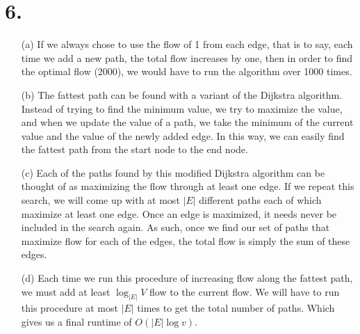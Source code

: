 \documentclass[11pt]{article}
\begin{document}
\section*{6.}
\begin{enumerate}
\item[(a)] If we always chose to use the flow of 1 from each edge, that is to
say, each time we add a new path, the total flow increases by one, then in order
to find the optimal flow (2000), we would have to run the algorithm over 1000
times. 
\item[(b)] The fattest path can be found with a variant of the Dijkstra
algorithm. Instead of trying to find the minimum value, we try to maximize the
value, and when we update the value of a path, we take the minimum of the
current value and the value of the newly added edge. In this way, we can easily
find the fattest path from the start node to the end node. 
\item[(c)] Each of the paths found by this modified Dijkstra algorithm can be
thought of as maximizing the flow through at least one edge. If we repeat this
search, we will come up with at most $|E|$ different paths each of which
maximize at least one edge. Once an edge is maximized, it needs never be
included in the search again. As such, once we find our set of paths that
maximize flow for each of the edges, the total flow is simply the sum of these
edges. 
\item[(d)] Each time we run this procedure of increasing flow along the fattest
path, we must add at least $\log_{|E|} V$ flow to the current flow. We will have
to run this procedure at most $|E|$ times to get the total number of paths.
Which gives us a final runtime of $O(|E|\log v)$.
\end{enumerate}
\end{document}
